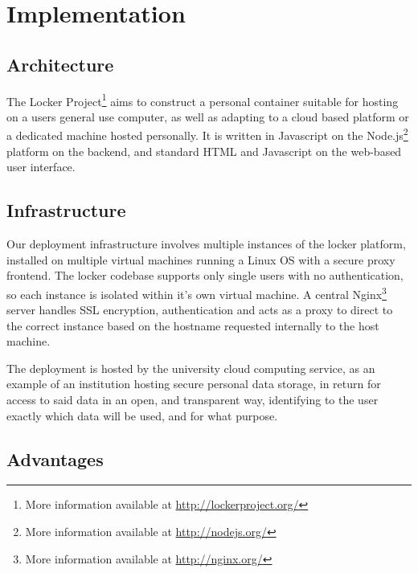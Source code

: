 \documentclass[11pt,a4paper,twoside]{article}
\begin{document}
\newpage
\section{Implementation}

\subsection{Architecture}
The Locker Project\footnote{More information available at \url{http://lockerproject.org/}} aims to construct a personal container suitable for hosting on a users general use computer, as well as adapting to a cloud based platform or a dedicated machine hosted personally. It is written in Javascript on the Node.js\footnote{More information available at \url{http://nodejs.org/}} platform on the backend, and standard HTML and Javascript on the web-based user interface. 


\subsection{Infrastructure}
Our deployment infrastructure involves multiple instances of the locker platform, installed on multiple virtual machines running a Linux OS with a secure proxy frontend. The locker codebase supports only single users with no authentication, so each instance is isolated within it's own virtual machine. A central Nginx\footnote{More information available at \url{http://nginx.org/}} server handles SSL encryption, authentication and acts as a proxy to direct to the correct instance based on the hostname requested internally to the host machine.

The deployment is hosted by the university cloud computing service, as an example of an institution hosting secure personal data storage, in return for access to said data in an open, and transparent way, identifying to the user exactly which data will be used, and for what purpose.

\newpage
\subsection{Advantages}
\end{document}
